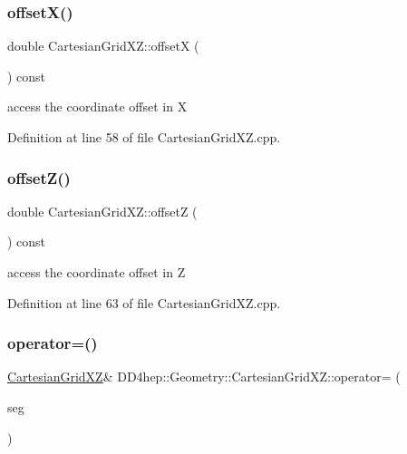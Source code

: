 \subsubsection{\texorpdfstring{offset\+X()}{offsetX()}}
{\footnotesize\ttfamily double Cartesian\+Grid\+X\+Z\+::offsetX (\begin{DoxyParamCaption}{ }\end{DoxyParamCaption}) const}



access the coordinate offset in X 



Definition at line 58 of file Cartesian\+Grid\+X\+Z.\+cpp.

\hypertarget{class_d_d4hep_1_1_geometry_1_1_cartesian_grid_x_z_a1d344c9a547a3c77b90b6ea58f06ff8d}{}\label{class_d_d4hep_1_1_geometry_1_1_cartesian_grid_x_z_a1d344c9a547a3c77b90b6ea58f06ff8d} 
\subsubsection{\texorpdfstring{offset\+Z()}{offsetZ()}}
{\footnotesize\ttfamily double Cartesian\+Grid\+X\+Z\+::offsetZ (\begin{DoxyParamCaption}{ }\end{DoxyParamCaption}) const}



access the coordinate offset in Z 



Definition at line 63 of file Cartesian\+Grid\+X\+Z.\+cpp.

\hypertarget{class_d_d4hep_1_1_geometry_1_1_cartesian_grid_x_z_a3d8a9bd431f6f7f9e4918c07fb43d606}{}\label{class_d_d4hep_1_1_geometry_1_1_cartesian_grid_x_z_a3d8a9bd431f6f7f9e4918c07fb43d606} 
\subsubsection{\texorpdfstring{operator=()}{operator=()}}
{\footnotesize\ttfamily \hyperlink{class_d_d4hep_1_1_geometry_1_1_cartesian_grid_x_z}{Cartesian\+Grid\+XZ}\& D\+D4hep\+::\+Geometry\+::\+Cartesian\+Grid\+X\+Z\+::operator= (\begin{DoxyParamCaption}\item[{const \hyperlink{class_d_d4hep_1_1_geometry_1_1_cartesian_grid_x_z}{Cartesian\+Grid\+XZ} \&}]{seg }\end{DoxyParamCaption})\hspace{0.3cm}{\ttfamily [default]}}



